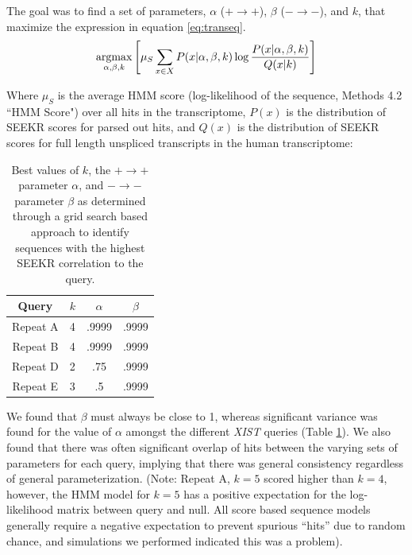 The goal was to find a set of parameters, $\alpha$ ($+\rightarrow +$), $\beta$ ($-\rightarrow -$), and $k$, that maximize the expression in equation \ref{eq:transeq}.
\begin{equation}
    \operatorname*{argmax}_{\alpha,\beta,k}\left[\mu_S\sum_{x\in X}P(x|\alpha,\beta,k)\log{\frac{P(x|\alpha,\beta,k)}{Q(x|k)}}\right]
\label{eq:transeq}
\end{equation}

Where $\mu_S$ is the average HMM score (log-likelihood of the sequence, Methods 4.2 ``HMM Score") over all hits in the transcriptome, $P(x)$ is the distribution of SEEKR scores for parsed out hits, and $Q(x)$ is the distribution of SEEKR scores for full length unspliced transcripts in the human transcriptome: 

\begin{table}[h]
\centering
\begin{center}
 \begin{tabular}{|c | c| c | c |} 
 \hline
 Query & $k$ & $\alpha$ & $\beta$ \\
 \hline\hline
 Repeat A & 4 & .9999 & .9999 \\ 
 \hline
 Repeat B & 4 & .9999 & .9999\\
 \hline
 Repeat D & 2 & .75 & .9999\\
 \hline
 Repeat E & 3 & .5 & .9999\\
 \hline
\end{tabular}
\end{center}
\caption[KL-Divergence best fit parameters]{Best values of $k$, the $+\rightarrow +$ parameter $\alpha$, and $-\rightarrow -$ parameter $\beta$ as determined through a grid search based approach to identify sequences with the highest SEEKR correlation to the query.}
\label{tbl:transparams}
\end{table}

We found that $\beta$ must always be close to 1, whereas significant variance was found for the value of $\alpha$ amongst the different \emph{XIST} queries (Table \ref{tbl:transparams}). We also found that there was often significant overlap of hits between the varying sets of parameters for each query, implying that there was general consistency regardless of general parameterization. (Note: Repeat A, $k=5$ scored higher than $k=4$, however, the HMM model for $k=5$ has a positive expectation for the log-likelihood matrix between query and null. All score based sequence models generally require a negative expectation \cite{Altschul1990BasicTool} to prevent spurious ``hits'' due to random chance, and simulations we performed indicated this was a problem). 
